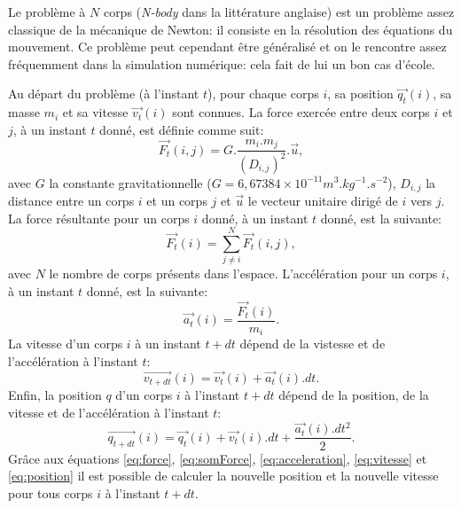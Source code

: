 Le problème à $N$ corps (\textit{N-body} dans la littérature anglaise) est un problème assez classique de la mécanique de {\sc Newton}: il consiste en la résolution des équations du mouvement. 
Ce problème peut cependant être généralisé et on le rencontre assez fréquemment dans la simulation numérique: cela fait de lui un bon cas d'école.

Au départ du problème (à l'instant $t$), pour chaque corps $i$, sa position $\vec{q_t}(i)$, sa masse $m_i$ et sa vitesse $\vec{v_t}(i)$ sont connues.
La force exercée entre deux corps $i$ et $j$, à un instant $t$ donné, est définie comme suit:
\begin{equation}
\label{eq:force}
	\vec{F_t}(i,j) = G.\frac{m_i.m_j}{(D_{i,j})^2}.\vec{u},
\end{equation}
avec $G$ la constante gravitationnelle ($G = 6,67384\times10^{-11} m^3.kg^{-1}.s^{-2}$), $D_{i,j}$ la distance entre un corps $i$ et un corps $j$ et $\vec{u}$ le vecteur unitaire dirigé de $i$ vers $j$.
La force résultante pour un corps $i$ donné, à un instant $t$ donné, est la suivante:
\begin{equation}
\label{eq:somForce}
	\vec{F_t}(i) = \sum_{j \ne i}^{N} \vec{F_t}(i,j),
\end{equation}
avec $N$ le nombre de corps présents dans l'espace.
L'accélération pour un corps $i$, à un instant $t$ donné, est la suivante:
\begin{equation}
\label{eq:acceleration}
	\vec{a_t}(i) = \frac{\vec{F_t}(i)}{m_i}.
\end{equation}
La vitesse d'un corps $i$ à un instant $t + dt$ dépend de la vistesse et de l'accélération à l'instant $t$:
\begin{equation}
\label{eq:vitesse}
	\vec{v_{t+dt}}(i) = \vec{v_{t}}(i) + \vec{a_t}(i).dt.
\end{equation}
Enfin, la position $q$ d'un corps $i$ à l'instant $t + dt$ dépend de la position, de la vitesse et de l'accélération à l'instant $t$:
\begin{equation}
\label{eq:position}
	\vec{q_{t+dt}}(i) = \vec{q_{t}}(i) + \vec{v_{t}}(i).dt + \frac{\vec{a_t}(i).dt^2}{2}.
\end{equation}
Grâce aux équations \ref{eq:force}, \ref{eq:somForce}, \ref{eq:acceleration}, \ref{eq:vitesse} et \ref{eq:position} il est possible de calculer la nouvelle position et la nouvelle vitesse pour tous corps $i$ à l'instant $t + dt$.

